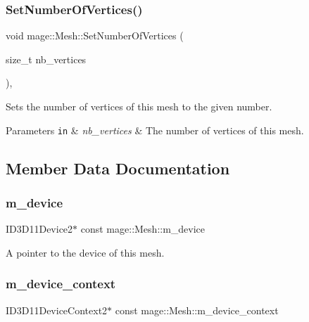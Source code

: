 \subsubsection{\texorpdfstring{Set\+Number\+Of\+Vertices()}{SetNumberOfVertices()}}
{\footnotesize\ttfamily void mage\+::\+Mesh\+::\+Set\+Number\+Of\+Vertices (\begin{DoxyParamCaption}\item[{size\+\_\+t}]{nb\+\_\+vertices }\end{DoxyParamCaption})\hspace{0.3cm}{\ttfamily [protected]}, {\ttfamily [noexcept]}}

Sets the number of vertices of this mesh to the given number.


\begin{DoxyParams}[1]{Parameters}
\mbox{\tt in}  & {\em nb\+\_\+vertices} & The number of vertices of this mesh. \\
\hline
\end{DoxyParams}


\subsection{Member Data Documentation}
\hypertarget{classmage_1_1_mesh_ad1d91b6048d73bb05d0d39028d048f18}{}\label{classmage_1_1_mesh_ad1d91b6048d73bb05d0d39028d048f18} 
\subsubsection{\texorpdfstring{m\+\_\+device}{m\_device}}
{\footnotesize\ttfamily I\+D3\+D11\+Device2$\ast$ const mage\+::\+Mesh\+::m\+\_\+device\hspace{0.3cm}{\ttfamily [protected]}}

A pointer to the device of this mesh. \hypertarget{classmage_1_1_mesh_a1d19b5bceea2256f4d80ebc06fa74f00}{}\label{classmage_1_1_mesh_a1d19b5bceea2256f4d80ebc06fa74f00} 
\subsubsection{\texorpdfstring{m\+\_\+device\+\_\+context}{m\_device\_context}}
{\footnotesize\ttfamily I\+D3\+D11\+Device\+Context2$\ast$ const mage\+::\+Mesh\+::m\+\_\+device\+\_\+context\hspace{0.3cm}{\ttfamily [protected]}}

